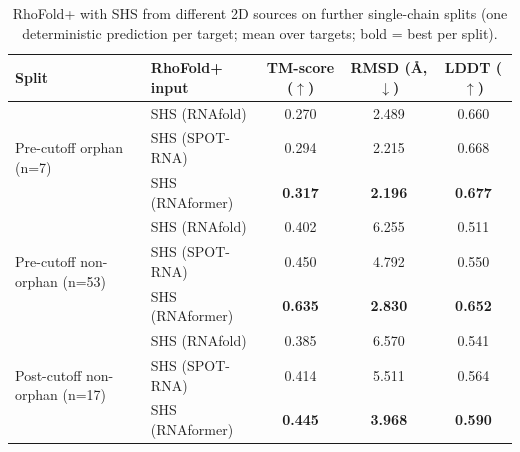 \begin{table}[t]
\centering
\caption{RhoFold+ with SHS from different 2D sources on further single-chain splits (one deterministic prediction per target; mean over targets; bold = best per split).}
\label{tab:rf_rna_single_chain_other_splits}
\begin{tabular}{llccc}
\toprule
Split & RhoFold+ input & TM-score ($\uparrow$) & RMSD (\AA, $\downarrow$) & LDDT ($\uparrow$) \\
\midrule
\multirow{3}{*}{Pre-cutoff orphan (n=7)} & SHS (RNAfold) & 0.270 & 2.489 & 0.660 \\
 & SHS (SPOT-RNA) & 0.294 & 2.215 & 0.668 \\
 & SHS (RNAformer) & \textbf{0.317} & \textbf{2.196} & \textbf{0.677} \\
\midrule
\multirow{3}{*}{Pre-cutoff non-orphan (n=53)} & SHS (RNAfold) & 0.402 & 6.255 & 0.511 \\
 & SHS (SPOT-RNA) & 0.450 & 4.792 & 0.550 \\
 & SHS (RNAformer) & \textbf{0.635} & \textbf{2.830} & \textbf{0.652} \\
\midrule
\multirow{3}{*}{Post-cutoff non-orphan (n=17)} & SHS (RNAfold) & 0.385 & 6.570 & 0.541 \\
 & SHS (SPOT-RNA) & 0.414 & 5.511 & 0.564 \\
 & SHS (RNAformer) & \textbf{0.445} & \textbf{3.968} & \textbf{0.590} \\
\bottomrule
\end{tabular}
\end{table}
